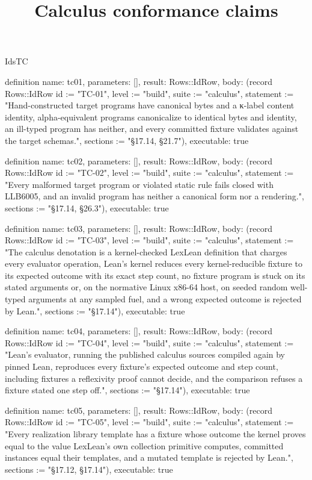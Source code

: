 \begin{lexlean}{IdsTC}
\title{Calculus conformance claims}
\begin{semanticmodule}
definition{
  name: tc01,
  parameters: [],
  result: Rows::IdRow,
  body: (record Rows::IdRow {id := "TC-01", level := "build", suite := "calculus", statement := "Hand-constructed target programs have canonical bytes and a κ-label content identity, alpha-equivalent programs canonicalize to identical bytes and identity, an ill-typed program has neither, and every committed fixture validates against the target schemas.", sections := "§17.14, §21.7"}),
  executable: true
}

definition{
  name: tc02,
  parameters: [],
  result: Rows::IdRow,
  body: (record Rows::IdRow {id := "TC-02", level := "build", suite := "calculus", statement := "Every malformed target program or violated static rule fails closed with LLB6005, and an invalid program has neither a canonical form nor a rendering.", sections := "§17.14, §26.3"}),
  executable: true
}

definition{
  name: tc03,
  parameters: [],
  result: Rows::IdRow,
  body: (record Rows::IdRow {id := "TC-03", level := "build", suite := "calculus", statement := "The calculus denotation is a kernel-checked LexLean definition that charges every evaluator operation, Lean's kernel reduces every kernel-reducible fixture to its expected outcome with its exact step count, no fixture program is stuck on its stated arguments or, on the normative Linux x86-64 host, on seeded random well-typed arguments at any sampled fuel, and a wrong expected outcome is rejected by Lean.", sections := "§17.14"}),
  executable: true
}

definition{
  name: tc04,
  parameters: [],
  result: Rows::IdRow,
  body: (record Rows::IdRow {id := "TC-04", level := "build", suite := "calculus", statement := "Lean's evaluator, running the published calculus sources compiled again by pinned Lean, reproduces every fixture's expected outcome and step count, including fixtures a reflexivity proof cannot decide, and the comparison refuses a fixture stated one step off.", sections := "§17.14"}),
  executable: true
}

definition{
  name: tc05,
  parameters: [],
  result: Rows::IdRow,
  body: (record Rows::IdRow {id := "TC-05", level := "build", suite := "calculus", statement := "Every realization library template has a fixture whose outcome the kernel proves equal to the value LexLean's own collection primitive computes, committed instances equal their templates, and a mutated template is rejected by Lean.", sections := "§17.12, §17.14"}),
  executable: true
}


\end{semanticmodule}
\end{lexlean}
